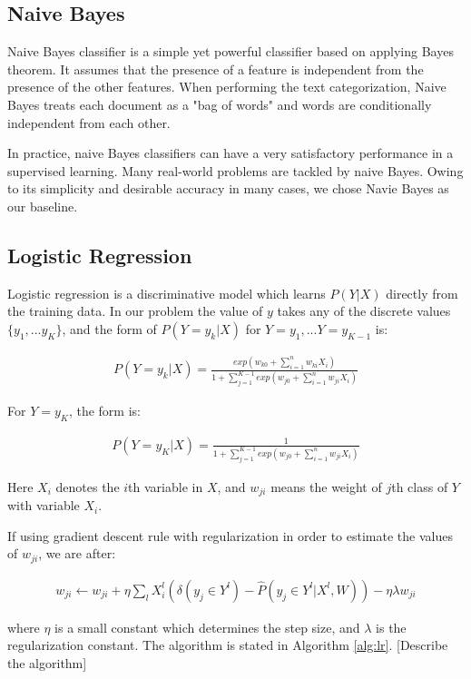 
\subsection{Naive Bayes}
Naive Bayes \cite{NaiveBayes} classifier is a simple yet powerful classifier based on applying Bayes theorem. It assumes that the presence of a feature is independent from the presence of the other features. When performing the text categorization, Naive Bayes treats each document as a "bag of words" and words are conditionally independent from each other.

In practice, naive Bayes classifiers can have a very satisfactory performance in a supervised learning. Many real-world problems are tackled by naive Bayes. Owing to its simplicity and desirable accuracy in many cases, we chose Navie Bayes as our baseline.


\subsection{Logistic Regression}

Logistic regression is a discriminative model which learns $P(Y|X)$ directly from the training data. In our problem the value of $y$ takes any of the discrete values $\{y_1,...y_K\}$, and the form of $P(Y=y_k|X)$ for $Y=y_1,...Y=y_{K-1}$ is: 

\begin{gather}
	P(Y=y_k|X)=\frac{exp(w_{k0}+\sum_{i=1}^n{w_{ki}X_i})}{1+\sum_{j=1}^{K-1}exp(w_{j0}+\sum_{i=1}^n{w_{ji}X_i})}
\end{gather}

For $Y=y_K$, the form is:

\begin{gather}
	P(Y=y_K|X)=\frac{1}{1+\sum_{j=1}^{K-1}exp(w_{j0}+\sum_{i=1}^n{w_{ji}X_i})}
\end{gather}

Here $X_i$ denotes the $i$th variable in $X$, and $w_{ji}$ means the weight of $j$th class of $Y$ with variable $X_i$.

If using gradient descent rule with regularization in order to estimate the values of $w_{ji}$, we are after:

\begin{gather}
	w_{ji} \leftarrow w_{ji}+ \eta \sum_{l}X_{i}^{l}(\delta (y_{j} \in Y^{l})-\hat{P}(y_{j} \in Y^{l}|X^{l},W))- \eta \lambda w_{ji}
\end{gather}

where $\eta$ is a small constant which determines the step size, and $\lambda$ is the regularization constant. The algorithm is stated in Algorithm \ref{alg:lr}. [Describe the algorithm]

